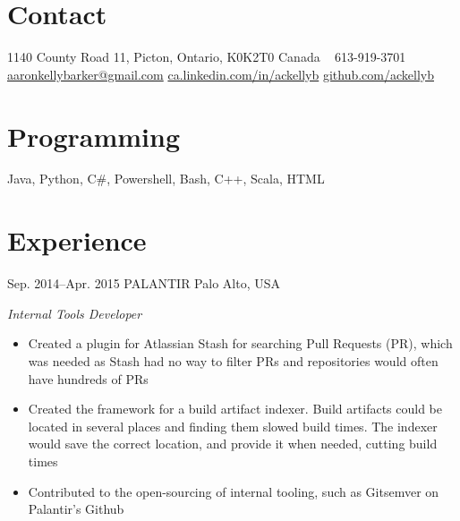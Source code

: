 \documentclass[]{friggeri-cv} %
\begin{document}



\begin{aside} %
\section{Contact}
1140 County Road 11, 
Picton, Ontario,
K0K2T0 Canada
~
613-919-3701
~
\href{mailto:aaron.kelly.barker@gmail.com}{aaronkellybarker@gmail.com}
\href{ca.linkedin.com/in/ackellyb/}{ca.linkedin.com/in/ackellyb}
\href{https://github.com/ackellyb}{github.com/ackellyb}
\section{Programming}
Java, Python, C\#,
Powershell, Bash, 
C++, Scala, HTML
\end{aside}


\section{Experience}

\begin{entrylist}
\entry
{Sep. 2014--Apr. 2015}
{PALANTIR}
{Palo Alto, USA}
{\emph{Internal Tools Developer} \\
\begin{itemize}
\item Created a plugin for Atlassian Stash for searching Pull Requests (PR), which was needed as Stash had no way to filter PRs and repositories would often have hundreds of PRs
\item Created the framework for a build artifact indexer. Build artifacts could be located in several places and finding them slowed build times. The indexer would save the correct location, and provide it when needed, cutting build times
\item Contributed to the open-sourcing of internal tooling, such as Gitsemver on Palantir's Github
\end{itemize}
}
\end{entrylist}
\end{document}
